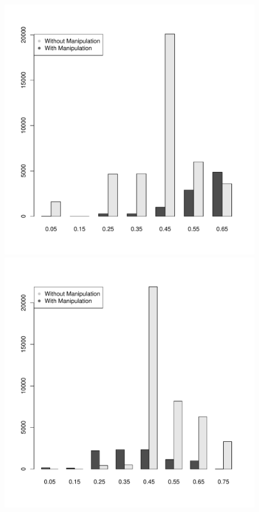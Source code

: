 \documentclass[12pt,letterpaper]{article} %
\begin{document}
\begin{center}
\begin{figure}[h!]
\begin{minipage}{0.45\textwidth}
\begin{center}
\includegraphics[scale=0.4]{../graphics/manipulator-utilities.pdf}
\end{center}
\end{minipage}
\hspace{0.05\textwidth}
\begin{minipage}{0.45\textwidth}
\begin{center}
\includegraphics[scale=0.4]{../graphics/nonmanipulators-utilities.pdf}

\end{center}
\end{minipage}
\end{figure}
\end{center}
\end{document}
